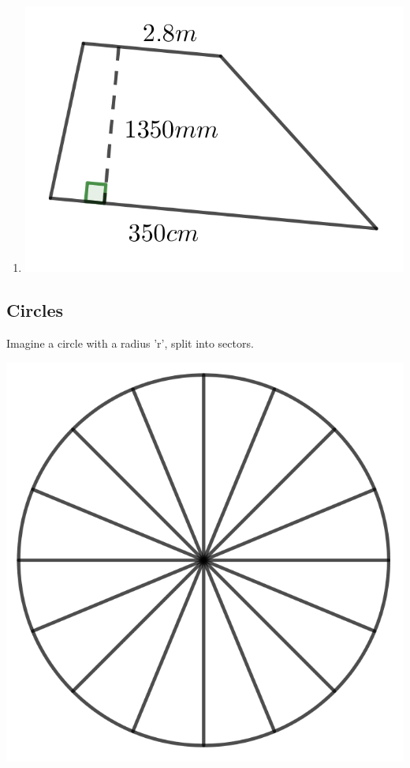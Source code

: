 \begin{multicols}{2}
\begin{enumerate}
	\item \includegraphics{./Images/Measurement/AreaQu16.png}
\end{enumerate}
\end{multicols}
\subsection{Circles}
Imagine a  circle with a radius 'r', split into sectors.

\bigskip

\includegraphics{./Images/Measurement/CircleSegmented.png}

